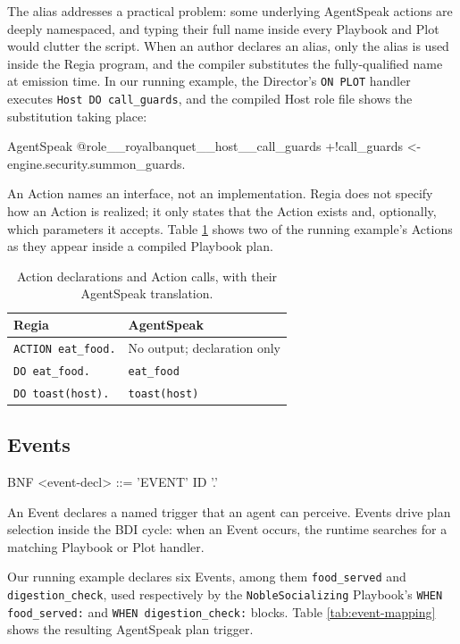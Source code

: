 The alias addresses a practical problem: some underlying AgentSpeak actions are deeply namespaced, and typing their full name inside every Playbook and Plot would clutter the script. When an author declares an alias, only the alias is used inside the Regia program, and the compiler substitutes the fully-qualified name at emission time. In our running example, the Director's \lstinline|ON PLOT| handler executes \lstinline|Host DO call_guards|, and the compiled Host role file shows the substitution taking place:

\begin{codeblock}[]{AgentSpeak}
@role__royalbanquet__host__call_guards
+!call_guards <- engine.security.summon_guards.
\end{codeblock}

An Action names an interface, not an implementation. Regia does not specify how an Action is realized; it only states that the Action exists and, optionally, which parameters it accepts. Table \ref{tab:action-mapping} shows two of the running example's Actions as they appear inside a compiled Playbook plan.

\begin{table}[h]
\centering
\begin{tabular}{|l|l|}
\hline
\textbf{Regia} & \textbf{AgentSpeak} \\
\hline
\lstinline|ACTION eat_food.| & No output; declaration only \\
\lstinline|DO eat_food.| & \lstinline|eat_food| \\
\lstinline|DO toast(host).| & \lstinline|toast(host)| \\
\hline
\end{tabular}
\caption{Action declarations and Action calls, with their AgentSpeak translation.}
\label{tab:action-mapping}
\end{table}

\subsection{Events}
\begin{codeblock}[]{BNF}
    <event-decl>     ::= 'EVENT' ID '.'
\end{codeblock}

An Event declares a named trigger that an agent can perceive. Events drive plan selection inside the BDI cycle: when an Event occurs, the runtime searches for a matching Playbook or Plot handler. 

Our running example declares six Events, among them \lstinline|food_served| and \lstinline|digestion_check|, used respectively by the \lstinline|NobleSocializing| Playbook's \lstinline|WHEN food_served:| and \lstinline|WHEN digestion_check:| blocks. Table \ref{tab:event-mapping} shows the resulting AgentSpeak plan trigger.

